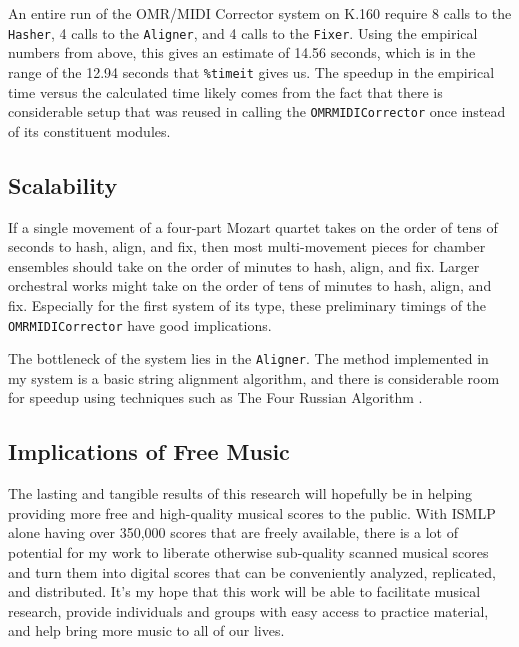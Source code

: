 An entire run of the OMR/MIDI Corrector system on K.160 require 8 calls to the \texttt{Hasher}, 4 calls to the \texttt{Aligner}, and 4 calls to the \texttt{Fixer}. Using the empirical numbers from above, this gives an estimate of 14.56 seconds, which is in the range of the 12.94 seconds that \texttt{\%timeit} gives us. The speedup in the empirical time versus the calculated time likely comes from the fact that there is considerable setup that was reused in calling the \texttt{OMRMIDICorrector} once instead of its constituent modules. 

\subsection{Scalability}
If a single movement of a four-part Mozart quartet takes on the order of tens of seconds to hash, align, and fix, then most multi-movement pieces for chamber ensembles should take on the order of minutes to hash, align, and fix. Larger orchestral works might take on the order of tens of minutes to hash, align, and fix. Especially for the first system of its type, these preliminary timings of the \texttt{OMRMIDICorrector} have good implications. 

The bottleneck of the system lies in the \texttt{Aligner}. The method implemented in my system is a basic string alignment algorithm, and there is considerable room for speedup using techniques such as The Four Russian Algorithm \cite{seqalign}. 

\subsection{Implications of Free Music}
The lasting and tangible results of this research will hopefully be in helping providing more free and high-quality musical scores to the public. With ISMLP alone having over 350,000 scores that are freely available, there is a lot of potential for my work to liberate otherwise sub-quality scanned musical scores and turn them into digital scores that can be conveniently analyzed, replicated, and distributed. It's my hope that this work will be able to facilitate musical research, provide individuals and groups with easy access to practice material, and help bring more music to all of our lives.
